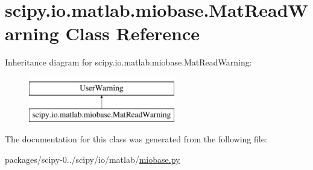 \hypertarget{classscipy_1_1io_1_1matlab_1_1miobase_1_1MatReadWarning}{}\section{scipy.\+io.\+matlab.\+miobase.\+Mat\+Read\+Warning Class Reference}
\label{classscipy_1_1io_1_1matlab_1_1miobase_1_1MatReadWarning}
Inheritance diagram for scipy.\+io.\+matlab.\+miobase.\+Mat\+Read\+Warning\+:\begin{figure}[H]
\begin{center}
\leavevmode
\includegraphics[height=2.000000cm]{classscipy_1_1io_1_1matlab_1_1miobase_1_1MatReadWarning}
\end{center}
\end{figure}


The documentation for this class was generated from the following file\+:\begin{DoxyCompactItemize}
\item 
packages/scipy-\/0../scipy/io/matlab/\hyperlink{miobase_8py}{miobase.\+py}\end{DoxyCompactItemize}
